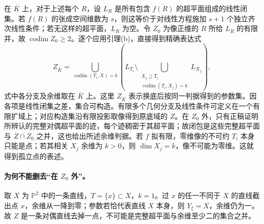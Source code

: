 \documentclass[openany,fontset=fandol]{ctexbook}
\DeclareMathOperator{\codim}{codim}
\newcommand{\PP}{\mathbb P}
\begin{document}
在 $\overline K$ 上，对于上述每个 $R$，设 $L_R$ 是所有包含 $\overline{f(R)}$ 的超平面组成的线性闭集。若 $f(R)$ 的张成空间维数为 $s$，则这等价于对线性方程施加 $s+1$ 个独立齐次线性条件；若无这样的超平面，$L_R$ 为空。令 $Z_0$ 为像正维的 $R$ 所给 $L_R$ 的有限并，故 $\codim Z_0\ge2$。逐个应用引理(b)，直接得到精确表达式
\[
 Z_{\overline K}=
 \bigcup_{\codim(T_i,X)=k}
 \left(L_{T_i}\setminus
 \bigcup_{\substack{X_j\supseteq T_i\\\codim(T_i,X_j)=k}} L_{X_j}\right),
\]
式中各分支及余维取在 $\overline K$ 上。这里 $Z_{\overline K}$ 表示换底后按同一判据得到的参数集。因各项是线性闭集之差，集合可构造。有限多个几何分支及线性条件可定义在一个有限扩域上；对应构造集沿有限投影取像得到原底域的 $Z$。在 $Z_0$ 外，只有正稿证明所辨认的完整对偶超平面的迹，每个迹稠密于其超平面；故闭包是这些完整超平面与 $\overline{Z\cap Z_0}$ 之并，这也给出所述余维判据。若 $f$ 拟有限，零维像的不可约 $T_i$ 本身只能是点；若其相关 $X_j$ 余维为 $k>0$，则 $\dim X_j=k$，像不可能为零维。这就得到孤立点的表述。

\paragraph{为何不能删去“在 $Z_0$ 外”。}
取 $X$ 为 $\PP^2$ 中的一条直线，$T=\{x\}\subset X$，$k=1$。过 $x$ 的任一不同于 $X$ 的直线截出点 $x$，余维从一降到零；参数若恰代表直线 $X$ 本身，则 $Y_\xi=X$，余维仍为一。故 $Z$ 是一条对偶直线去掉一点，不可能是完整超平面与余维至少二的集合之并。
\end{document}
